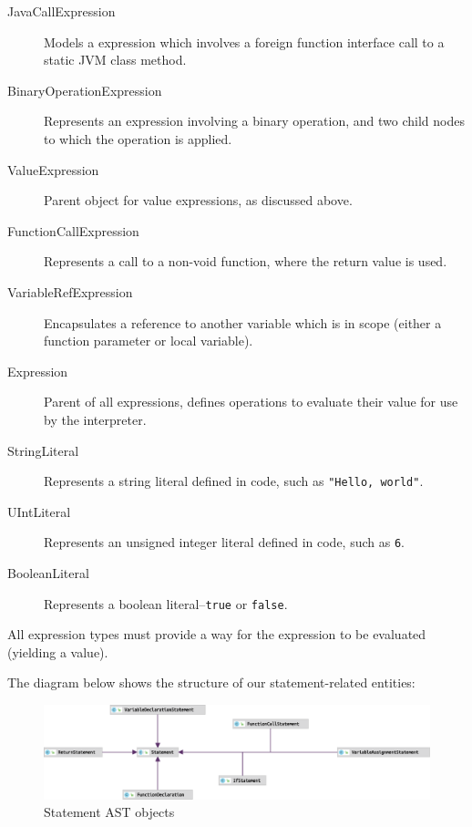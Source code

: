 \documentclass[a4paper,openany,12pt]{book}
\begin{document}
\begin{description}
    \item[JavaCallExpression] Models a expression which involves a foreign function interface call to a static JVM class method.
    \item[BinaryOperationExpression] Represents an expression involving a binary operation, and two child nodes to which the operation is applied.
    \item[ValueExpression] Parent object for value expressions, as discussed above.
    \item[FunctionCallExpression] Represents a call to a non-void function, where the return value is used.
    \item[VariableRefExpression] Encapsulates a reference to another variable which is in scope (either a function parameter or local variable).
    \item[Expression] Parent of all expressions, defines operations to evaluate their value for use by the interpreter.
    \item[StringLiteral] Represents a string literal defined in code, such as  \texttt{"Hello, world"}.
    \item[UIntLiteral] Represents an unsigned integer literal defined in code, such as  \texttt{6}.
    \item[BooleanLiteral] Represents a boolean literal--\texttt{true} or \texttt{false}.
\end{description}

All expression types must provide a way for the expression to be evaluated (yielding a value).

The diagram below shows the structure of our statement-related entities:

\begin{figure}[H]
    \begin{MyMdframed}
        \vspace{0.5em}

        \caption{\label{figure:ast:statements}Statement AST objects}
        \vspace{0.5em}
        \captionsetup{style=default}

        \centering \includegraphics[width=0.9\linewidth]{statements.eps}
    \end{MyMdframed}
\end{figure}
\end{document}
